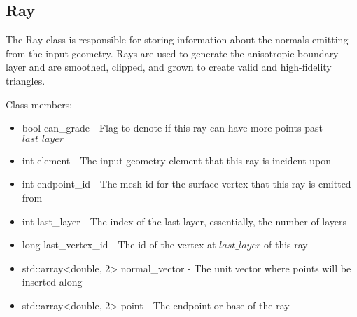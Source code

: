 \documentclass[manuscript, screen]{acmart}
\begin{document}
\subsection{Ray}
The Ray class is responsible for storing information about the normals emitting from the input geometry. Rays are used to generate the anisotropic boundary layer and are smoothed, clipped, and grown to create valid and high-fidelity triangles.

Class members:
\begin{itemize}
\item bool can\_grade - Flag to denote if this ray can have more points past $last\_layer$
\item int element - The input geometry element that this ray is incident upon
\item int endpoint\_id - The mesh id for the surface vertex that this ray is emitted from
\item int last\_layer - The index of the last layer, essentially, the number of layers
\item long last\_vertex\_id - The id of the vertex at $last\_layer$ of this ray
\item std::array<double, 2> normal\_vector - The unit vector where points will be inserted along
\item std::array<double, 2> point - The endpoint or base of the ray
\end{itemize}
\end{document}
